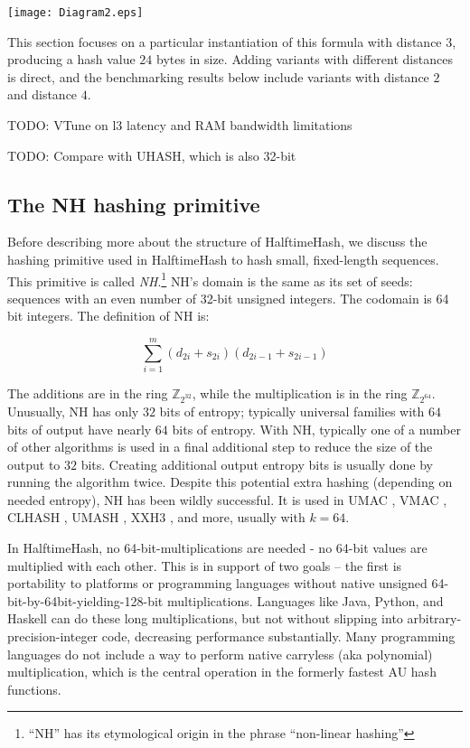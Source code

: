\documentclass[sigconf, nonacm]{acmart}
\newcommand{\ints}{\mathbb{Z}}
\begin{document}
\texttt{[image: Diagram2.eps]}

This section focuses on a particular instantiation of this formula with distance $3$, producing a hash value $24$ bytes in size.
Adding variants with different distances is direct, and the benchmarking results below include variants with distance $2$ and distance $4$.

TODO: VTune on l3 latency and RAM bandwidth limitations

 TODO: Compare with UHASH, which is also 32-bit

\subsection{The NH hashing primitive}

Before describing more about the structure of HalftimeHash, we discuss the hashing primitive used in HalftimeHash to hash small, fixed-length sequences.
This primitive is called {\em NH}.\footnote{``NH'' has its etymological origin in the phrase ``non-linear hashing''} \cite{umac}
NH's domain is the same as its set of seeds: sequences with an even number of 32-bit unsigned integers.
The codomain is 64 bit integers.
The definition of NH is:

$$\sum_{i=1}^m (d_{2i} + s_{2i})(d_{2i-1} + s_{2i-1})$$

The additions are in the ring $\ints_{2^{32}}$, while the multiplication is in the ring $\ints_{2^{64}}$.
Unusually, NH has only $32$ bits of entropy; typically universal families with $64$ bits of output have nearly $64$ bits of entropy. \cite{umash,clhash}
With NH, typically one of a number of other algorithms is used in a final additional step to reduce the size of the output to $32$ bits.
Creating additional output entropy bits is usually done by running the algorithm twice. \cite{umash,umac}
Despite this potential extra hashing (depending on needed entropy), NH has been wildly successful.
It is used in UMAC \cite{umac}, VMAC \cite{vmac}, CLHASH \cite{clhash}, UMASH \cite{umash}, XXH3 \cite{xxh3}, and more, usually with $k = 64$.

In HalftimeHash, no 64-bit-mul\-ti\-pli\-ca\-tions are needed - no 64-bit values are multiplied with each other.
This is in support of two goals --
the first is portability to platforms or programming languages without native unsigned 64-bit-by-64bit-yielding-128-bit multiplications.
Languages like Java, Python, and Haskell can do these long multiplications, but not without slipping into arbitrary-precision-integer code, decreasing performance substantially.
Many programming languages do not include a way to perform native carryless (aka polynomial) multiplication, which is the central operation in the formerly fastest AU hash functions. \cite{umash,clhash}
\end{document}
